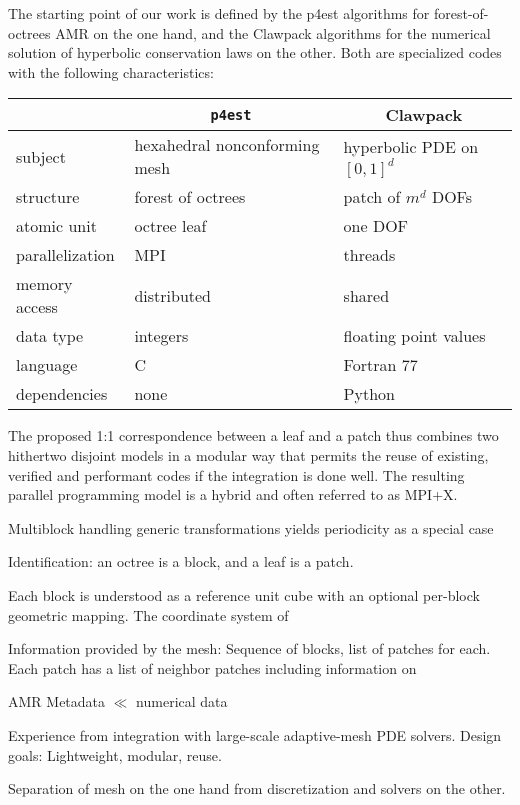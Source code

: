 \documentclass{IOS-Book-Article}     %
\begin{document}
The starting point of our work is defined by the p4est algorithms for
forest-of-octrees AMR on the one hand, and the Clawpack algorithms for the
numerical solution of hyperbolic conservation laws
on the other.  Both are specialized codes with the following characteristics:
\begin{center}
\begin{tabular}{l|l|l}
& \multicolumn{1}{c|}{\texttt{p4est}} & \multicolumn{1}{c}{Clawpack} \\
\hline
subject & hexahedral nonconforming mesh &  hyperbolic PDE on $[0, 1]^d$ \\
structure & forest of octrees & patch of $m^d$ DOFs \\
atomic unit & octree leaf & one DOF \\
parallelization & MPI & threads \\
memory access & distributed & shared \\
data type & integers & floating point values \\
language & C & Fortran 77 \\
dependencies & none & Python \\
\hline
\end{tabular}
\end{center}
The proposed 1:1 correspondence between a leaf and a patch thus combines two
hithertwo disjoint models in a modular way that permits the reuse of existing,
verified and performant codes if the integration is done well.  The resulting
parallel programming model is a hybrid and often referred to as MPI+X.

Multiblock handling
generic transformations
yields periodicity as a special case

Identification: an octree is a block, and a leaf is a patch.

Each block is understood as a reference unit cube with an optional per-block
geometric mapping.  The coordinate system of 


Information provided by the mesh:
Sequence of blocks, list of patches for each.  Each patch
has a list of neighbor patches including information on 


AMR Metadata $\ll$ numerical data


Experience from integration with large-scale adaptive-mesh PDE solvers.
Design goals: Lightweight, modular, reuse.

Separation of mesh on the one hand from discretization and solvers on the other.
\end{document}
